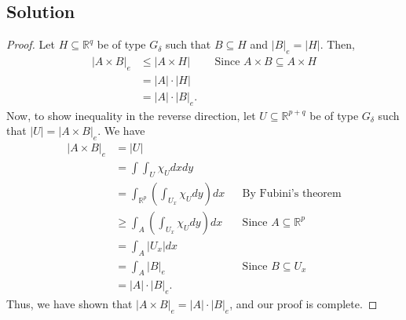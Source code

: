 \documentclass[10pt,a4paper]{article}
\theoremstyle{theorem}
\theoremstyle{definition}
\begin{document}
\subsection*{Solution}
\begin{proof}
Let $H \subseteq \mathbb{R}^q$ be of type $G_\delta$ such that $B \subseteq H$ and $|B|_e = |H|$. Then,
\begin{align*}
|A \times B|_e &\leq |A \times H| &&\text{Since } A \times B \subseteq A \times H\\
&= |A| \cdot |H|\\
&= |A| \cdot |B|_e.
\end{align*}
Now, to show inequality in the reverse direction, let $U \subseteq \mathbb{R}^{p + q}$ be of type $G_\delta$ such that $|U| = |A \times B|_e$. We have
\begin{align*}
|A \times B|_e &= |U|\\
&= \int \int_U \chi_U dx dy\\
&= \int_{\mathbb{R}^p} \left( \int_{U_x} \chi_U dy \right) dx &&\text{By Fubini's theorem}\\
&\geq \int_{A} \left( \int_{U_x} \chi_U dy \right) dx &&\text{Since } A \subseteq \mathbb{R}^p\\
&= \int_A |U_x| dx\\
&= \int_A |B|_e &&\text{Since } B \subseteq U_x\\
&= |A| \cdot |B|_e.
\end{align*}
Thus, we have shown that $|A \times B|_e = |A| \cdot |B|_e$, and our proof is complete.
\end{proof}
\end{document}
